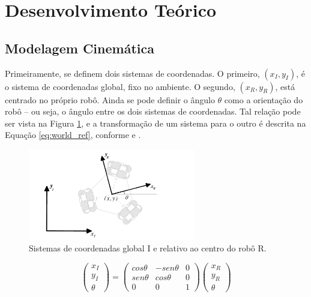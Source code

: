 \section{Desenvolvimento Teórico}
\label{sec:teorico}

\subsection{Modelagem Cinemática}

Primeiramente, se definem dois sistemas de coordenadas. O primeiro, $(x_I,y_I)$, é o sistema de coordenadas global, fixo no ambiente. O segundo, $(x_R,y_R)$, está centrado no próprio robô. Ainda se pode definir o ângulo $\theta$ como a orientação do robô -- ou seja, o ângulo entre os dois sistemas de coordenadas. Tal relação pode ser vista na Figura \ref{fig:ref}, e a transformação de um sistema para o outro é descrita na Equação \ref{eq:world_ref}, conforme \citet{siegwart2011introduction} e \citet{ritter2016modelagem}.

\begin{figure}[h]
  \centering
  \includegraphics[width = 0.65\textwidth]{imagens/ref}
  \caption{Sistemas de coordenadas global I e relativo ao centro do robô R.}
  \label{fig:ref}
\end{figure}

\begin{equation}
  \begin{pmatrix}
    x_I \\
    y_I \\
    \theta
  \end{pmatrix}
  =
  \begin{pmatrix}
    cos \theta & -sen \theta & 0 \\
    sen\theta  &  cos \theta & 0 \\
    0          & 0          & 1
  \end{pmatrix}
  \begin{pmatrix}
    x_R \\
    y_R \\
    \theta
  \end{pmatrix}
  \label{eq:world_ref}
\end{equation}


